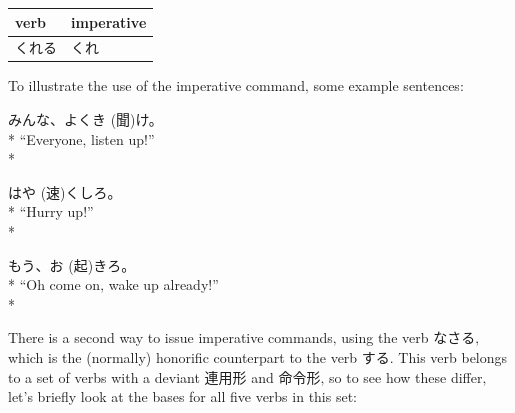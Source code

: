 \documentclass[11pt, b5paper, twoside, openright, onecolumn]{book}
\makeatletter
\newcommand*{\rubystack}[2]{{\relscale{0.5}%
  \begin{tabular}[b]{@{}c@{}}%
    {#1}\\%
   {\textscale{2}{#2}}%
  \end{tabular}}%
}
\DeclareRobustCommand*{\ruby}[2]{%
  \mbox{%
    \setlength{\parskip}{0ex}%
    \BeginAccSupp{method=pdfstringdef,ActualText={#1}}%
      \rubystack{\phantom{#2}}{#1}%
      \llap{%
        \rubystack{#2}{\phantom{#1}}%
      }%
    \EndAccSupp{}%
  }%
}
\renewcommand*{\ruby}[2]{#2 (#1)}%
\newenvironment{exampleblock}{
\setlength{\parindent}{0.6in}
\begin{minipage}[t]{\dimexpr\textwidth-\parindent}}
{\end{minipage}}
\newenvironment{mytabular}[1]{\noindent\hspace{0.4in}
\begin{tabular}[h]{#1}}{\end{tabular}}
\makeatother
\begin{document}
\vspace{0.5cm}
\smaller
\begin{mytabular}{| l  l |}\hline 
\rule{0pt}{2.4ex}verb & imperative\\ 
\hline
\rule{0pt}{2.4ex}くれる & くれ\\ 
\hline 
\end{mytabular}
\larger
\vspace{0.5cm}


To illustrate the use of the imperative command‚ some example sentences:

\vspace{0.4cm}
\begin{exampleblock}
みんな、よく\ruby{聞}{き}け。 \\* 
“Everyone‚ listen up!” \\* 
\end{exampleblock}
\vspace{0.2cm}

\begin{exampleblock}
\ruby{速}{はや}くしろ。 \\* 
“Hurry up!” \\* 
\end{exampleblock}
\vspace{0.2cm}

\begin{exampleblock}
もう、\ruby{起}{お}きろ。 \\* 
“Oh come on‚ wake up already!” \\* 
\end{exampleblock}
\vspace{0.2cm}

There is a second way to issue imperative commands‚ using the verb なさる‚ which is the (normally) honorific counterpart to the verb する. This verb belongs to a set of verbs with a deviant 連用形 and 命令形‚ so to see how these differ‚ let’s briefly look at the bases for all five verbs in this set:
\end{document}
